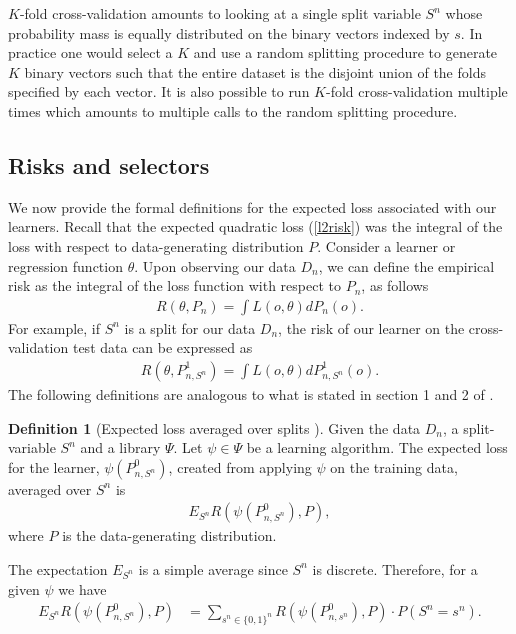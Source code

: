 \documentclass[11pt, a4paper]{article}
\theoremstyle{definition}
\newtheorem{definition}[theorem]{Definition}
\theoremstyle{remark}
\newcommand{\btheta}{\theta}
\newcommand{\la}{\psi}
\newcommand{\Sn}{S^n}
\newcommand{\lib}{\Psi}
\begin{document}
$ K $-fold cross-validation amounts to looking at a single split variable $ \Sn $ whose probability mass is equally distributed on the binary vectors indexed by $ s $. In practice one would select a $ K $ and use a random splitting procedure to generate $ K $ binary vectors such that the entire dataset is the disjoint union of the folds specified by each vector. It is also possible to run $ K $-fold cross-validation multiple times which amounts to multiple calls to the random splitting procedure.
\subsection{Risks and selectors}
We now provide the formal definitions for the expected loss associated with our learners. Recall that the expected quadratic loss (\ref{l2risk}) was the integral of the loss with respect to data-generating distribution $P$. Consider a learner or regression function $ \theta $. Upon observing our data $D_n$, we can define the empirical risk as the integral of the loss function with respect to $P_n$, as follows
\begin{align*}
    R(\btheta , P_n) = \int L(o, \btheta) d P_{n}(o). 
\end{align*}
For example, if $\Sn$ is a split for our data $D_n$, the risk of our learner on the cross-validation test data can be expressed as
 \begin{align*}
     R(\theta, P_{n, \Sn}^{1}) =  \int L(o, \btheta) d P_{n,\Sn}^{1}(o).
 \end{align*}
 The following definitions are analogous to what is stated in section 1 and 2 of  \parencite{laan03}.
 \begin{definition}[Expected loss averaged over splits \parencite{vaart06}]
     Given the data $D_n$, a split-variable $\Sn$ and a library $ \lib $. Let $ \la \in \lib $ be a learning algorithm. The expected loss for the learner, $\la(P_{n,\Sn}^0)$, created from applying $ \la $ on the training data, averaged over $ \Sn $ is  
    \begin{align*}
        E_{\Sn} R( \la(P_{n,\Sn}^{0}), P),
    \end{align*}
    where $ P $ is the data-generating distribution.
\end{definition}
The expectation $ E_{\Sn} $ is a simple average since $ \Sn $ is discrete. Therefore, for a given $ \la $ we have 
\begin{align*}
    E_{\Sn} R( \la(P_{n,\Sn}^{0}), P) &= \sum_{s^{n} \in \{0,1\}^{n}} R(\la(P_{n, s^{n}}^{0}), P) \cdot P(\Sn = s^{n}). 
\end{align*}
\end{document}
